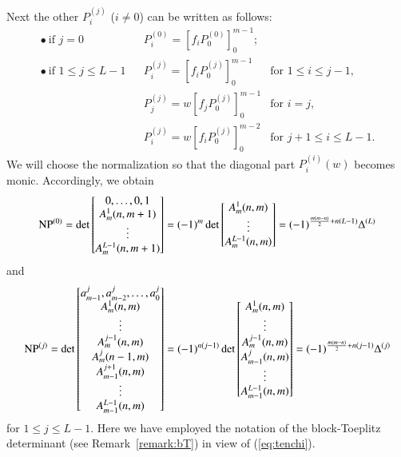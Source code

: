 \documentclass[12pt]{article}
\numberwithin{equation}{section}
\begin{document}
Next the other $P_i^{(j)}$ ($i\neq 0$) can be written as follows:
\[
\begin{array}{lllll}
\bullet \ \text{if $j=0$} &&
P_i^{(0)} 
= 
\left[
 f_i  P_0^{(0)}
\right]^{m-1}_{0};
\\ 
\bullet \ \text{if $1 \leq  j \leq L-1$} &&
P_i^{(j)} = 
\left[
 f_i  P_0^{(j)}
\right]^{m-1}_{0}  
&\text{for $1 \leq i \leq j-1$},
\\
&&P_j^{(j)} = 
w \left[
 f_j  P_0^{(j)}
\right]^{m-1}_{0}
&\text{for  $i =j$},
\\
&&P_i^{(j)} = 
w \left[
 f_i  P_0^{(j)}
\right]^{m-2}_{0}
&\text{for  $j+1 \leq i \leq L-1$}.
\end{array}
\]
We will choose the normalization so that 
the diagonal part
$P^{(i)}_i(w)$ becomes monic.
Accordingly, we obtain
\begin{equation}
\label{eq:np0}
{\rm NP}^{(0)}
=\det 
\begin{bmatrix}
0, \ldots,0,1
\\
A^1_{m}(n,m+1) 
\\
\vdots
\\
A^{L-1}_{m}(n,m+1) 
\end{bmatrix}
= 
(-1)^m\det 
\begin{bmatrix}
A^1_{m}(n,m) 
\\
\vdots
\\
A^{L-1}_{m}(n,m) 
\end{bmatrix}
=(-1)^{\frac{m(m-n)}{2} +n(L-1)} \Delta^{(L)}
\end{equation}
and
\begin{equation}
\label{eq:npk}
{\rm NP}^{(j)}
=
\det 
\begin{bmatrix}
a^j_{m-1},a^j_{m-2}, \ldots, a^j_{0}
\\
A^1_{m}(n,m) 
\\
\vdots
\\
A^{j-1}_{m}(n,m)
\\ 
A^{j}_{m}(n-1,m)
\\ 
A^{j+1}_{m-1}(n,m)
\\
\vdots \\
A^{L-1}_{m-1}(n,m) 
\end{bmatrix}
=
(-1)^{n(j-1)}
\det 
\begin{bmatrix}
A^1_{m}(n,m) 
\\
\vdots
\\
A^{j-1}_{m}(n,m)
\\ 
A^{j}_{m-1}(n,m)
\\ 
\vdots \\
A^{L-1}_{m-1}(n,m) 
\end{bmatrix}
=(-1)^{\frac{m(m-n)}{2} +n(j-1)} \Delta^{(j)}
\end{equation}
for $1 \leq j \leq L-1 $.
Here we have employed
 the notation of the block-Toeplitz determinant
(see Remark~\ref{remark:bT}) in view of
(\ref{eq:tenchi}).
\end{document}
